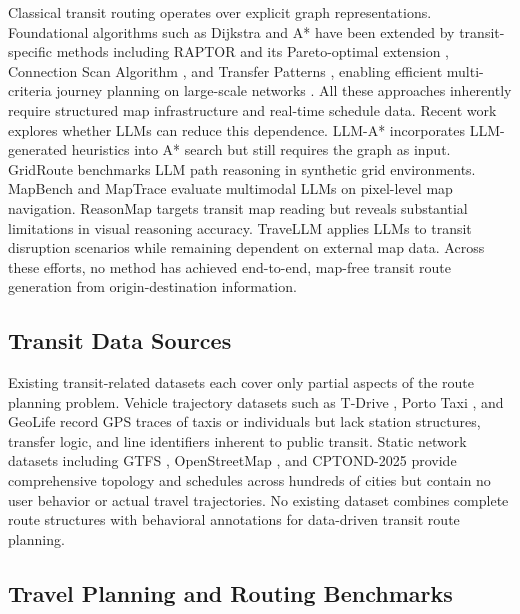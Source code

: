 \documentclass{article}
\begin{document}
Classical transit routing operates over explicit graph representations. Foundational algorithms such as Dijkstra \cite{dijkstra2022note} and A* \cite{hart1968formal} have been extended by transit-specific methods including RAPTOR \cite{delling2015round} and its Pareto-optimal extension \cite{delling2019fast}, Connection Scan Algorithm \cite{dibbelt2018csa}, and Transfer Patterns \cite{bast2010transfer}, enabling efficient multi-criteria journey planning on large-scale networks \cite{bast2016route}. All these approaches inherently require structured map infrastructure and real-time schedule data. Recent work explores whether LLMs can reduce this dependence. LLM-A* \cite{meng2024llmastar} incorporates LLM-generated heuristics into A* search but still requires the graph as input. GridRoute \cite{lin2025gridroute} benchmarks LLM path reasoning in synthetic grid environments. MapBench \cite{xing2025mapbench} and MapTrace \cite{chen2025maptrace} evaluate multimodal LLMs on pixel-level map navigation. ReasonMap \cite{feng2025can} targets transit map reading but reveals substantial limitations in visual reasoning accuracy. TraveLLM \cite{fang2025travellm} applies LLMs to transit disruption scenarios while remaining dependent on external map data. Across these efforts, no method has achieved end-to-end, map-free transit route generation from origin-destination information.

\subsection{Transit Data Sources}

Existing transit-related datasets each cover only partial aspects of the route planning problem. Vehicle trajectory datasets such as T-Drive \cite{yuan2010tdrive}, Porto Taxi \cite{moreira2013porto}, and GeoLife \cite{zheng2010geolife} record GPS traces of taxis or individuals \cite{zheng2015trajectory} but lack station structures, transfer logic, and line identifiers inherent to public transit. Static network datasets including GTFS \cite{wong2013leveraging}, OpenStreetMap \cite{haklay2008openstreetmap}, and CPTOND-2025 \cite{wang2026china} provide comprehensive topology and schedules across hundreds of cities but contain no user behavior or actual travel trajectories. No existing dataset combines complete route structures with behavioral annotations for data-driven transit route planning.

\subsection{Travel Planning and Routing Benchmarks}
\end{document}
